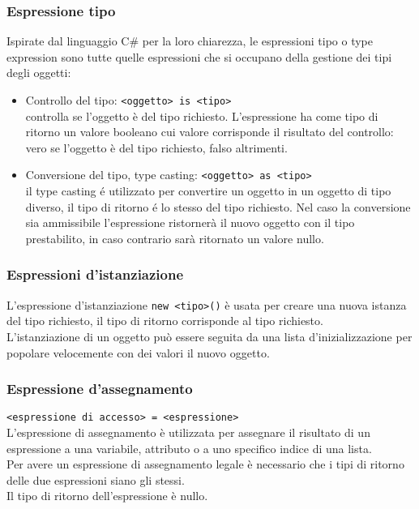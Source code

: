 \subsubsection{Espressione tipo} 
Ispirate dal linguaggio C\# per la loro chiarezza,
le espressioni tipo o type expression sono tutte quelle espressioni che si occupano della 
gestione dei tipi degli oggetti:
\begin{itemize}
    \item
    {
        Controllo del tipo: \lstinline|<oggetto> is <tipo>| \\
        controlla se l'oggetto è del tipo richiesto.
        L'espressione ha come tipo di ritorno un valore booleano cui valore corrisponde il risultato del controllo:
        vero se l'oggetto è del tipo richiesto, falso altrimenti.
    }
    \item 
    {
        Conversione del tipo, type casting: \lstinline|<oggetto> as <tipo>| \\
        il type casting é utilizzato
        per convertire un oggetto in un oggetto di tipo diverso, il tipo di ritorno é lo stesso del tipo richiesto.
        Nel caso la conversione sia ammissibile l'espressione ristornerà il nuovo oggetto con il tipo prestabilito,
        in caso contrario sarà ritornato un valore nullo.
    }
\end{itemize}

\subsubsection{Espressioni d'istanziazione}
L'espressione d'istanziazione \lstinline|new <tipo>()| è usata per creare una nuova istanza del tipo
richiesto, il tipo di ritorno corrisponde al tipo richiesto.
\\
L'istanziazione di un oggetto può essere seguita da una lista d'inizializzazione per popolare 
velocemente con dei valori il nuovo oggetto.

\subsubsection{Espressione d'assegnamento}
\lstinline|<espressione di accesso> = <espressione>| \\
L'espressione di assegnamento è utilizzata per assegnare il risultato di un espressione
a una variabile, attributo o a uno specifico indice di una lista. \\
Per avere un espressione di assegnamento legale è necessario che i tipi di ritorno
delle due espressioni siano gli stessi. \\
Il tipo di ritorno dell'espressione è nullo.

